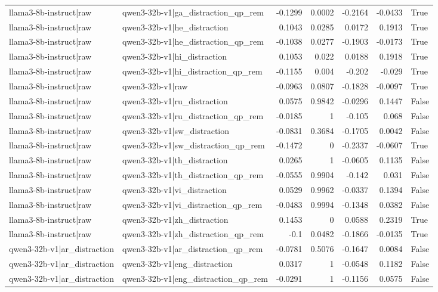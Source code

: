 \begin{table}
\begin{tabular}{l l r r r r l}
llama3-8b-instruct|raw & qwen3-32b-v1|ga_distraction_qp_rem & -0.1299 & 0.0002 & -0.2164 & -0.0433 & True \\
llama3-8b-instruct|raw & qwen3-32b-v1|he_distraction & 0.1043 & 0.0285 & 0.0172 & 0.1913 & True \\
llama3-8b-instruct|raw & qwen3-32b-v1|he_distraction_qp_rem & -0.1038 & 0.0277 & -0.1903 & -0.0173 & True \\
llama3-8b-instruct|raw & qwen3-32b-v1|hi_distraction & 0.1053 & 0.022 & 0.0188 & 0.1918 & True \\
llama3-8b-instruct|raw & qwen3-32b-v1|hi_distraction_qp_rem & -0.1155 & 0.004 & -0.202 & -0.029 & True \\
llama3-8b-instruct|raw & qwen3-32b-v1|raw & -0.0963 & 0.0807 & -0.1828 & -0.0097 & True \\
llama3-8b-instruct|raw & qwen3-32b-v1|ru_distraction & 0.0575 & 0.9842 & -0.0296 & 0.1447 & False \\
llama3-8b-instruct|raw & qwen3-32b-v1|ru_distraction_qp_rem & -0.0185 & 1 & -0.105 & 0.068 & False \\
llama3-8b-instruct|raw & qwen3-32b-v1|sw_distraction & -0.0831 & 0.3684 & -0.1705 & 0.0042 & False \\
llama3-8b-instruct|raw & qwen3-32b-v1|sw_distraction_qp_rem & -0.1472 & 0 & -0.2337 & -0.0607 & True \\
llama3-8b-instruct|raw & qwen3-32b-v1|th_distraction & 0.0265 & 1 & -0.0605 & 0.1135 & False \\
llama3-8b-instruct|raw & qwen3-32b-v1|th_distraction_qp_rem & -0.0555 & 0.9904 & -0.142 & 0.031 & False \\
llama3-8b-instruct|raw & qwen3-32b-v1|vi_distraction & 0.0529 & 0.9962 & -0.0337 & 0.1394 & False \\
llama3-8b-instruct|raw & qwen3-32b-v1|vi_distraction_qp_rem & -0.0483 & 0.9994 & -0.1348 & 0.0382 & False \\
llama3-8b-instruct|raw & qwen3-32b-v1|zh_distraction & 0.1453 & 0 & 0.0588 & 0.2319 & True \\
llama3-8b-instruct|raw & qwen3-32b-v1|zh_distraction_qp_rem & -0.1 & 0.0482 & -0.1866 & -0.0135 & True \\
qwen3-32b-v1|ar_distraction & qwen3-32b-v1|ar_distraction_qp_rem & -0.0781 & 0.5076 & -0.1647 & 0.0084 & False \\
qwen3-32b-v1|ar_distraction & qwen3-32b-v1|eng_distraction & 0.0317 & 1 & -0.0548 & 0.1182 & False \\
qwen3-32b-v1|ar_distraction & qwen3-32b-v1|eng_distraction_qp_rem & -0.0291 & 1 & -0.1156 & 0.0575 & False \\

\end{tabular}
\end{table}
